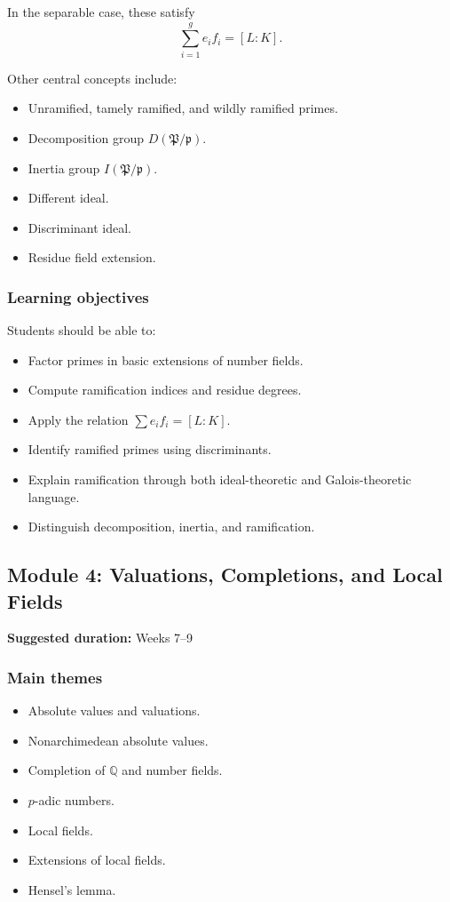 \documentclass[11pt]{article}
\begin{document}
In the separable case, these satisfy
\[
    \sum_{i=1}^{g}e_i f_i=[L:K].
\]

Other central concepts include:

\begin{itemize}
    \item Unramified, tamely ramified, and wildly ramified primes.
    \item Decomposition group \(D(\mathfrak{P}/\mathfrak{p})\).
    \item Inertia group \(I(\mathfrak{P}/\mathfrak{p})\).
    \item Different ideal.
    \item Discriminant ideal.
    \item Residue field extension.
\end{itemize}

\subsubsection*{Learning objectives}

Students should be able to:

\begin{itemize}
    \item Factor primes in basic extensions of number fields.
    \item Compute ramification indices and residue degrees.
    \item Apply the relation
          \(\sum e_i f_i=[L:K]\).
    \item Identify ramified primes using discriminants.
    \item Explain ramification through both ideal-theoretic and
          Galois-theoretic language.
    \item Distinguish decomposition, inertia, and ramification.
\end{itemize}

\subsection{Module 4: Valuations, Completions, and Local Fields}

\textbf{Suggested duration:} Weeks 7--9

\subsubsection*{Main themes}

\begin{itemize}
    \item Absolute values and valuations.
    \item Nonarchimedean absolute values.
    \item Completion of \(\mathbb{Q}\) and number fields.
    \item \(p\)-adic numbers.
    \item Local fields.
    \item Extensions of local fields.
    \item Hensel's lemma.
\end{itemize}
\end{document}
